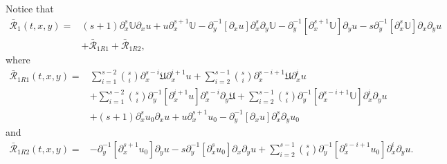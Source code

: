 \documentclass{amsart}
\numberwithin{equation}{section}
\begin{document}
Notice that
\begin{align*}
\bar{\mathcal{R}}_{1}(t,x,y)
=& (s+1)\partial_{x}^{s}\mathbb{U}\partial_{x}u
  +u\partial_{x}^{s+1}\mathbb{U}
  -\partial_{y}^{-1}[\partial_{x}u]\partial_{x}^{s}\partial_{y}\mathbb{U}
  -\partial_{y}^{-1}[\partial_{x}^{s+1}\mathbb{U}]\partial_{y}u
  -s\partial_{y}^{-1}[\partial_{x}^{s}\mathbb{U}]\partial_{x}\partial_{y}u\\
 &+\bar{\mathcal{R}}_{1R1}
  +\bar{\mathcal{R}}_{1R2},
\end{align*}
where
\begin{align*}
\bar{\mathcal{R}}_{1R1}(t,x,y)
=& \sum_{i=1}^{s-2}\binom{s}{i}\partial_{x}^{s-i}\mathfrak{U}\partial_{x}^{i+1}u
  +\sum_{i=2}^{s-1}\binom{s}{i}\partial_{x}^{s-i+1}\mathfrak{U}\partial_{x}^{i}u\\
 &+\sum_{i=1}^{s-2}\binom{s}{i}\partial_{y}^{-1}[\partial_{x}^{i+1}u]\partial_{x}^{s-i}\partial_{y}\mathfrak{U}
  +\sum_{i=2}^{s-1}\binom{s}{i}\partial_{y}^{-1}[\partial_{x}^{s-i+1}\mathbb{U}]\partial_{x}^{i}\partial_{y}u\\
 &+(s+1)\partial_{x}^{s}u_{0}\partial_{x}u
  +u\partial_{x}^{s+1}u_{0}
  -\partial_{y}^{-1}[\partial_{x}u]\partial_{x}^{s}\partial_{y}u_{0}
\end{align*}
and
\begin{align*}
\bar{\mathcal{R}}_{1R2}(t,x,y)
=&-\partial_{y}^{-1}[\partial_{x}^{s+1}u_{0}]\partial_{y}u
  -s\partial_{y}^{-1}[\partial_{x}^{s}u_{0}]\partial_{x}\partial_{y}u
  +\sum_{i=2}^{s-1}\binom{s}{i}\partial_{y}^{-1}[\partial_{x}^{s-i+1}u_{0}]\partial_{x}^{i}\partial_{y}u.
\end{align*}
\end{document}
